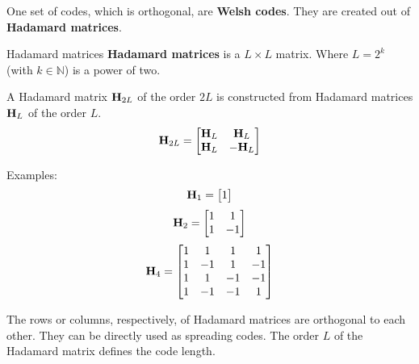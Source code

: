 \begin{refsection}
One set of codes, which is orthogonal, are  \textbf{Welsh codes}. They are created out of \textbf{Hadamard matrices}.

\begin{definition}{Hadamard matrices}
	 \textbf{Hadamard matrices} is a $L \times L$ matrix. Where $L = 2^k$ (with $k \in \mathbb{N}$) is a power of two.
	
	A Hadamard matrix $\bm{\mathrm{H}}_{2L}$ of the order $2L$ is constructed from Hadamard matrices $\bm{\mathrm{H}}_{L}$ of the order $L$.
	\begin{equation}
		\bm{\mathrm{H}}_{2L} = \left[\begin{matrix}
			\bm{\mathrm{H}}_{L} & \bm{\mathrm{H}}_{L} \\
			\bm{\mathrm{H}}_{L} & -\bm{\mathrm{H}}_{L} \\
		\end{matrix}\right]
	\end{equation}
	
	Examples:
	\begin{equation}
		\bm{\mathrm{H}}_{1} = \left[\begin{matrix} 1 \\ \end{matrix}\right]
	\end{equation}
	\begin{equation}
		\bm{\mathrm{H}}_{2} = \left[\begin{matrix}
			1 & 1 \\
			1 & -1 \\
		\end{matrix}\right]
	\end{equation}
	\begin{equation}
		\bm{\mathrm{H}}_{4} = \left[\begin{matrix}
			1 & 1 & 1 & 1 \\
			1 & -1 & 1 & -1 \\
			1 & 1 & -1 & -1 \\
			1 & -1 & -1 & 1 \\
		\end{matrix}\right]
	\end{equation}
\end{definition}

The rows or columns, respectively, of Hadamard matrices are orthogonal to each other. They can be directly used as spreading codes. The order $L$ of the Hadamard matrix defines the code length.


\end{refsection}
